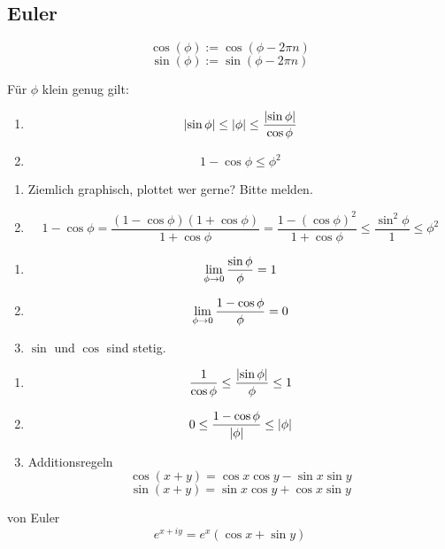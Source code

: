 \subsection{Euler}
\begin{Def}
  \[\cos(\phi):=\cos(\phi-2\pi n)\]
  \[\sin(\phi):=\sin(\phi-2\pi n)\]
\end{Def}
\begin{Sat}
  Für $\phi$ klein genug gilt:
  \begin{enumerate}
    \item 
      \[\mathopen| \sin\phi \mathclose|\leq\mathopen| \phi \mathclose|\leq\frac{\mathopen| \sin\phi \mathclose|}{\cos\phi}\]
    \item
      \[1-\cos\phi\leq\phi^2\]
  \end{enumerate}
\end{Sat}
\begin{Bew}
  \begin{enumerate}
    \item Ziemlich graphisch, plottet wer gerne? Bitte melden.
    \item
      \[1-\cos\phi=\frac{(1-\cos\phi)(1+\cos\phi)}{1+\cos\phi}=\frac{1-(\cos\phi)^2}{1+\cos\phi}\leq\frac{\sin^2\phi}{1}\leq\phi^2\]
  \end{enumerate}
\end{Bew}
\begin{Kor}
  \begin{enumerate}
    \item \[\displaystyle\lim_{\phi\rightarrow0}\frac{\sin\phi}{\phi}=1\]
    \item \[\displaystyle\lim_{\phi\rightarrow0}\frac{1-\cos\phi}{\phi}=0\]
    \item $\sin$ und $\cos$ sind stetig.
  \end{enumerate}
\end{Kor}
\begin{Bew}
  \begin{enumerate}
    \item \[\frac{1}{\cos\phi}\leq\frac{\mathopen| \sin\phi \mathclose|}{\phi}\leq 1\]
    \item \[0\leq\frac{1-\cos\phi}{\mathopen| \phi \mathclose|}\leq\mathopen| \phi \mathclose|\]
    \item Additionsregeln
      \[\cos(x+y)=\cos x\cos y-\sin x\sin y\]
      \[\sin(x+y)=\sin x\cos y+\cos x\sin y\]
  \end{enumerate}
\end{Bew}
\begin{Sat}{von Euler}\label{s:Euler}
  \[e^{x+iy}=e^x(\cos x+\sin y)\]
\end{Sat}
